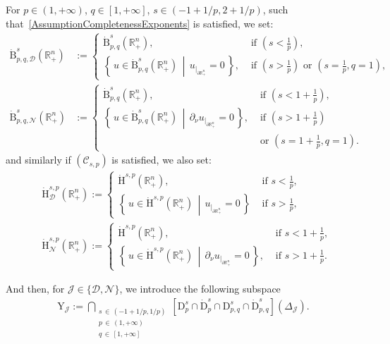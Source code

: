 \documentclass[10pt]{amsart}
\theoremstyle{definition}\newtheorem{defi}[theo]{Definition}\newtheorem{rema}[theo]{Remark}\newtheorem{exam}[theo]{Example}\newtheorem{exem}[theo]{Example}\newtheorem{nota}[theo]{Notation}
\newcommand{\bbR}{\mathbb{R}}
\newcommand{\rmH}{\mathrm{H}}%
\newcommand{\rmB}{\mathrm{B}}
\newcommand{\rmD}{\mathrm{D}}
\newcommand{\rmY}{\mathrm{Y}}
\newcommand{\clC}{\mathcal{C}}
\newcommand{\clN}{\mathcal{N}}
\newcommand{\clJ}{\mathcal{J}}
\newcommand{\clD}{\mathcal{D}}
\begin{document}
For $p\in(1,+\infty)$, $q\in[1,+\infty]$, $s\in(-1+1/p,2+1/p)$, such that~\eqref{AssumptionCompletenessExponents} is satisfied, we set:
\begin{align*}
\dot{\rmB}^{s}_{p,q,\clD}\left(\bbR^n_+\right) &{:=}
\begin{cases} \dot{\rmB}^{s}_{p,q}\left(\bbR^n_+\right), &\text{ if } \left(s < \frac{1}{p}\right),\\
\left\{ \,u\in \dot{\rmB}^{s}_{p,q}\left(\bbR^n_+\right)\, \middle|\, u_{|_{\partial\bbR^n_+}}=0 \,\right\},
&\text{ if } \left(s > \frac{1}{p}\right) \text{ or } 
\left(s = \frac{1}{p}, q=1\right),
\end{cases}\\
\dot{\rmB}^{s}_{p,q,\clN}\left(\bbR^n_+\right) &{:=}
\begin{cases} 
\dot{\rmB}^{s}_{p,q}\left(\bbR^n_+\right), &\text{ if } \left(s < 1+ \frac{1}{p}\right), \\
\left\{ \,u\in \dot{\rmB}^{s}_{p,q}\left(\bbR^n_+\right)\, \middle|\, \partial_{\nu}u_{|_{\partial\bbR^n_+}}=0\,\right\},
&\text{ if }\left(s >1+ \frac{1}{p}\right)\\ &\text{ or }\left(s = 1+\frac{1}{p}, q=1\right).
\end{cases}
\end{align*}
and similarly if $(\clC_{s,p})$ is satisfied, we also set:
\begin{align*}
&\dot{\rmH}^{s,p}_{\clD}\left(\bbR^n_+\right):=
\begin{cases} \dot{\rmH}^{s,p}\left(\bbR^n_+\right),
&\text{ if } s < \frac{1}{p},\\
\left\{ \,u\in \dot{\rmH}^{s,p}\left(\bbR^n_+\right)\, \middle|\, u_{|_{\partial\bbR^n_+}}=0 \,\right\} &\text{ if }s > \frac{1}{p},
\end{cases}\\
&\dot{\rmH}^{s,p}_{\clN}\left(\bbR^n_+\right):=
\begin{cases} \dot{\rmH}^{s,p}\left(\bbR^n_+\right), &\text{ if } s < 1+ \frac{1}{p},\\
\left\{ \,u\in \dot{\rmH}^{s,p}\left(\bbR^n_+\right)\, \middle|\, \partial_{\nu}u_{|_{\partial\bbR^n_+}}=0\,\right\}, &\text{ if }s >1+ \frac{1}{p}.
\end{cases}
\end{align*}

And then, for $\clJ\in\{\clD,\clN\}$, we introduce the following subspace
\begin{align*}
\rmY_{\clJ}:= \bigcap_{\substack{s\,\in\,\left(-1+1/p,1/p\right) \\
p\,\in\,(1,+\infty)\\
q\,\in\,[1,+\infty]}} \left[{\rmD}^{s}_{p}\cap\dot{\rmD}^{s}_{p}\cap{\rmD}^{s}_{p,q}\cap\dot{\rmD}^{s}_{p,q}\right]({{\Delta}}_{\clJ}) .
\end{align*}
\end{document}
